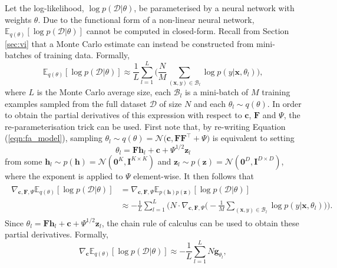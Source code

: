 \documentclass[msc,deptreport.inf]{infthesis} %
\newcommand{\matr}[1]{\mathbf{#1}}
\newcommand{\E}{\mathbb E}
\begin{document}
Let the log-likelihood, $\log p(\mathcal{D} | \theta)$, be parameterised by a neural network with weights $\theta$. Due to the functional form of a non-linear neural network, $\E_{q(\theta)} [\log p(\mathcal{D} | \theta)]$ cannot be computed in closed-form. Recall from Section \ref{sec:vi} that a Monte Carlo estimate can instead be constructed from mini-batches of training data. Formally, 
\begin{equation}
	 \E_{q(\theta)} [\log p(\mathcal{D} | \theta)]
	\approx \frac{1}{L} \sum_{l=1}^{L} \Bigg( \frac{N}{M} \sum_{(\matr{x}, y) \in \mathcal{B}_l} \log p(y | \matr{x}, \theta_l) \Bigg),
\end{equation}
where $L$ is the Monte Carlo average size, each $\mathcal{B}_l$ is a mini-batch of $M$ training examples sampled from the full dataset $\mathcal{D}$ of size $N$ and each $\theta_l \sim q(\theta)$. In order to obtain the partial derivatives of this expression with respect to $\matr{c}$, $\matr{F}$ and $\Psi$, the re-parameterisation trick \cite{goodfellow2016} can be used. First note that, by re-writing Equation (\ref{eqn:fa_model}), sampling $\theta_l \sim q(\theta) = \mathcal{N}\big(\matr{c}, \matr{FF}^{\intercal} + \Psi\big)$ is equivalent to setting  
\begin{equation}\label{eqn:fa_reparam_trick}
	\theta_l = \matr{F}\matr{h}_l + \matr{c} + \Psi^{1/2} \matr{z}_l
\end{equation}
from some $\matr{h}_l \sim p(\matr{h}) = \mathcal{N}(\matr{0}^K, \matr{I}^{K \times K})$ and $\matr{z}_l \sim p(\matr{z}) = \mathcal{N}(\matr{0}^D, \matr{I}^{D \times D})$, where the exponent is applied to $\Psi$ element-wise. 
It then follows that
\begin{align}
\begin{split}\label{eqn:expected_grad_log_likelihood}
	\nabla_{\matr{c}, \matr{F}, \Psi} \E_{q(\theta)} [\log p(\mathcal{D} | \theta)]
	& = \nabla_{\matr{c}, \matr{F}, \Psi} \E_{p(\matr{h})p(\matr{z})} [\log p(\mathcal{D} | \theta)] \\
	& \approx -\frac{1}{L} \sum_{l=1}^{L} \Bigg(N \cdot \nabla_{\matr{c}, \matr{F}, \Psi} \Bigg( -\frac{1}{M} \sum_{(\matr{x}, y) \in \mathcal{B}_l} \log p(y | \matr{x}, \theta_l) \Bigg) \Bigg).
\end{split}
\end{align}
Since $\theta_l = \matr{F}\matr{h}_l + \matr{c} + \Psi^{1/2} \matr{z}_l$, the chain rule of calculus can be used to obtain these partial derivatives. Formally,
\begin{equation}
	 \nabla_\matr{c} \E_{q(\theta)} [\log p(\mathcal{D} | \theta)]
	 \approx -\frac{1}{L} \sum_{l=1}^{L} N \matr{g}_{\theta_l},
\end{equation}
\end{document}

